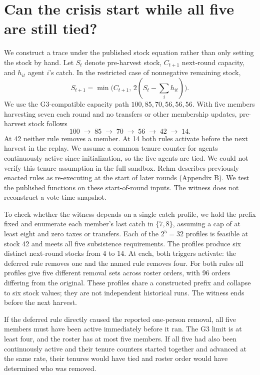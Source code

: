 \documentclass[letterpaper]{article}
\begin{document}
\section{Can the crisis start while all five are still tied?}
We construct a trace under the published stock equation \citep[Eq.~1 and Appendix~A.1]{rehm2026} rather than only setting the stock by hand. Let $S_t$ denote pre-harvest stock, $C_{t+1}$ next-round capacity, and $h_{it}$ agent $i$'s catch. In the restricted case of nonnegative remaining stock,
\[
S_{t+1}=\min\bigl(C_{t+1},\,2(S_t-\textstyle\sum_i h_{it})\bigr).
\]
We use the G3-compatible capacity path $100,85,70,56,56,56$. With five members harvesting seven each round and no transfers or other membership updates, pre-harvest stock follows
\[
100\;\longrightarrow\;85\;\longrightarrow\;70\;\longrightarrow\;56\;\longrightarrow\;42\;\longrightarrow\;14.
\]
At 42 neither rule removes a member. At 14 both rules activate before the next harvest in the replay. We assume a common tenure counter for agents continuously active since initialization, so the five agents are tied. We could not verify this tenure assumption in the full sandbox. Rehm describes previously enacted rules as re-executing at the start of later rounds (Appendix B). We test the published functions on these start-of-round inputs. The witness does not reconstruct a vote-time snapshot.

To check whether the witness depends on a single catch profile, we hold the prefix fixed and enumerate each member's last catch in $\{7,8\}$, assuming a cap of at least eight and zero taxes or transfers. Each of the $2^5=32$ profiles is feasible at stock 42 and meets all five subsistence requirements. The profiles produce six distinct next-round stocks from 4 to 14. At each, both triggers activate: the deferred rule removes one and the named rule removes four. For both rules all profiles give five different removal sets across roster orders, with 96 orders differing from the original. These profiles share a constructed prefix and collapse to six stock values; they are not independent historical runs. The witness ends before the next harvest.

If the deferred rule directly caused the reported one-person removal, all five members must have been active immediately before it ran. The G3 limit is at least four, and the roster has at most five members. If all five had also been continuously active and their tenure counters started together and advanced at the same rate, their tenures would have tied and roster order would have determined who was removed.
\end{document}
